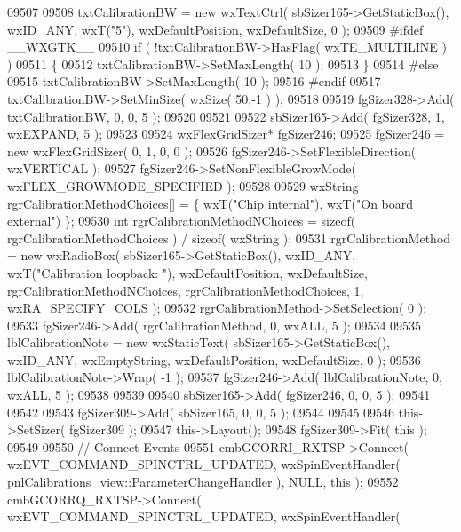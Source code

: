 \begin{DoxyCode}
09507     
09508     txtCalibrationBW = \textcolor{keyword}{new} wxTextCtrl( sbSizer165->GetStaticBox(), wxID\_ANY, wxT(\textcolor{stringliteral}{"5"}), wxDefaultPosition, 
      wxDefaultSize, 0 );
09509 \textcolor{preprocessor}{    #ifdef \_\_WXGTK\_\_}
09510     \textcolor{keywordflow}{if} ( !txtCalibrationBW->HasFlag( wxTE\_MULTILINE ) )
09511     \{
09512     txtCalibrationBW->SetMaxLength( 10 );
09513     \}
09514 \textcolor{preprocessor}{    #else}
09515     txtCalibrationBW->SetMaxLength( 10 );
09516 \textcolor{preprocessor}{    #endif}
09517     txtCalibrationBW->SetMinSize( wxSize( 50,-1 ) );
09518     
09519     fgSizer328->Add( txtCalibrationBW, 0, 0, 5 );
09520     
09521     
09522     sbSizer165->Add( fgSizer328, 1, wxEXPAND, 5 );
09523     
09524     wxFlexGridSizer* fgSizer246;
09525     fgSizer246 = \textcolor{keyword}{new} wxFlexGridSizer( 0, 1, 0, 0 );
09526     fgSizer246->SetFlexibleDirection( wxVERTICAL );
09527     fgSizer246->SetNonFlexibleGrowMode( wxFLEX\_GROWMODE\_SPECIFIED );
09528     
09529     wxString rgrCalibrationMethodChoices[] = \{ wxT(\textcolor{stringliteral}{"Chip internal"}), wxT(\textcolor{stringliteral}{"On board external"}) \};
09530     \textcolor{keywordtype}{int} rgrCalibrationMethodNChoices = \textcolor{keyword}{sizeof}( rgrCalibrationMethodChoices ) / \textcolor{keyword}{sizeof}( wxString );
09531     rgrCalibrationMethod = \textcolor{keyword}{new} wxRadioBox( sbSizer165->GetStaticBox(), wxID\_ANY, wxT(\textcolor{stringliteral}{"Calibration loopback:
      "}), wxDefaultPosition, wxDefaultSize, rgrCalibrationMethodNChoices, rgrCalibrationMethodChoices, 1, 
      wxRA\_SPECIFY\_COLS );
09532     rgrCalibrationMethod->SetSelection( 0 );
09533     fgSizer246->Add( rgrCalibrationMethod, 0, wxALL, 5 );
09534     
09535     lblCalibrationNote = \textcolor{keyword}{new} wxStaticText( sbSizer165->GetStaticBox(), wxID\_ANY, wxEmptyString, 
      wxDefaultPosition, wxDefaultSize, 0 );
09536     lblCalibrationNote->Wrap( -1 );
09537     fgSizer246->Add( lblCalibrationNote, 0, wxALL, 5 );
09538     
09539     
09540     sbSizer165->Add( fgSizer246, 0, 0, 5 );
09541     
09542     
09543     fgSizer309->Add( sbSizer165, 0, 0, 5 );
09544     
09545     
09546     this->SetSizer( fgSizer309 );
09547     this->Layout();
09548     fgSizer309->Fit( \textcolor{keyword}{this} );
09549     
09550     \textcolor{comment}{// Connect Events}
09551     cmbGCORRI_RXTSP->Connect( wxEVT\_COMMAND\_SPINCTRL\_UPDATED, wxSpinEventHandler( 
      pnlCalibrations_view::ParameterChangeHandler ), NULL, \textcolor{keyword}{this} );
09552     cmbGCORRQ_RXTSP->Connect( wxEVT\_COMMAND\_SPINCTRL\_UPDATED, wxSpinEventHandler( 

\end{DoxyCode}
